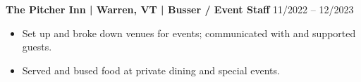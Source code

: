 \noindent
\textbf{The Pitcher Inn | Warren, VT | Busser / Event Staff} \hfill 11/2022 -- 12/2023
\begin{itemize}
    \item Set up and broke down venues for events; communicated with and supported guests.
    \item Served and bused food at private dining and special events.
\end{itemize}
